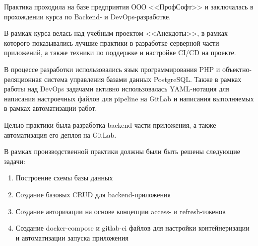 \documentclass[pract]{SCWorks}
\begin{document}

\date{2024}

\maketitle






\sloppy

\intro{}

Практика проходила на базе предприятия ООО <<ПрофСофт>> и заключалась в 
прохождении курса по Backend- и DevOps-разработке. 

В рамках курса велась над учебным проектом <<Анекдоты>>, в рамках которого
показывались лучшие практики в разработке серверной части приложений, а также
техники по поддержке и настройке CI/CD на проекте.

В процессе разработки использовались язык программирования PHP и
объектно-реляционная система управления базами данных PostgreSQL. Также в
рамках работы над DevOps задачами активно использовалась YAML-нотация для
написания настроечных файлов для pipeline на GitLab и написания 
выполняемых в рамках автоматизации работ.

Целью практики была разработка backend-части приложения, а также 
автоматизация его деплоя на GitLab.

В рамках производственной практики должны были быть решены следующие задачи:
\begin{enumerate}
    \item Построение схемы базы данных
    \item Создание базовых CRUD для backend-приложения
    \item Создание авторизации на основе концепции access- и refresh-токенов
    \item Создание docker-compose и gitlab-ci файлов для настройки
    контейнеризации и автоматизации запуска приложения  
\end{enumerate}
\end{document}
